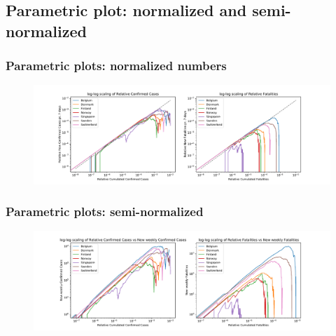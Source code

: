 \documentclass{beamer}
\begin{document}
\subsection{Parametric plot: normalized and semi-normalized}
\begin{frame}
\frametitle{Parametric plots: normalized numbers}
\begin{figure}[H]
\includegraphics[width=\textwidth]{../figs/parametric_plots_normalized_log.pdf}
\end{figure}
\end{frame}

\begin{frame}
\frametitle{Parametric plots: semi-normalized}
\begin{figure}[H]
\includegraphics[width=\textwidth]{../figs/parametric_plots_semi-normalized_log.pdf}
\end{figure}
\end{frame}
\end{document}
